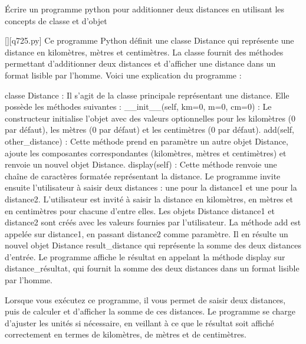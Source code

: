         \question
        Écrire un programme python pour additionner deux distances en utilisant les concepts de classe et d'objet
        \par
        \begin{solution}
            \renewcommand{\nomfichier}{q725.py}
            \pythonfile{\chemincode \nomfichier}[][\nomfichier]
            Ce programme Python définit une classe Distance qui représente une distance en kilomètres, mètres et centimètres. La classe fournit des méthodes permettant d'additionner deux distances et d'afficher une distance dans un format lisible par l'homme. Voici une explication du programme :

    classe Distance : Il s'agit de la classe principale représentant une distance. Elle possède les méthodes suivantes :
        \_\_init\_\_(self, km=0, m=0, cm=0) : Le constructeur initialise l'objet avec des valeurs optionnelles pour les kilomètres (0 par défaut), les mètres (0 par défaut) et les centimètres (0 par défaut).
        add(self, other\_distance) : Cette méthode prend en paramètre un autre objet Distance, ajoute les composantes correspondantes (kilomètres, mètres et centimètres) et renvoie un nouvel objet Distance.
        display(self) : Cette méthode renvoie une chaîne de caractères formatée représentant la distance.
    Le programme invite ensuite l'utilisateur à saisir deux distances : une pour la distance1 et une pour la distance2. L'utilisateur est invité à saisir la distance en kilomètres, en mètres et en centimètres pour chacune d'entre elles.
    Les objets Distance distance1 et distance2 sont créés avec les valeurs fournies par l'utilisateur.
    La méthode add est appelée sur distance1, en passant distance2 comme paramètre. Il en résulte un nouvel objet Distance result\_distance qui représente la somme des deux distances d'entrée.
    Le programme affiche le résultat en appelant la méthode display sur distance\_résultat, qui fournit la somme des deux distances dans un format lisible par l'homme.

Lorsque vous exécutez ce programme, il vous permet de saisir deux distances, puis de calculer et d'afficher la somme de ces distances. Le programme se charge d'ajuster les unités si nécessaire, en veillant à ce que le résultat soit affiché correctement en termes de kilomètres, de mètres et de centimètres.
        \end{solution}
        

